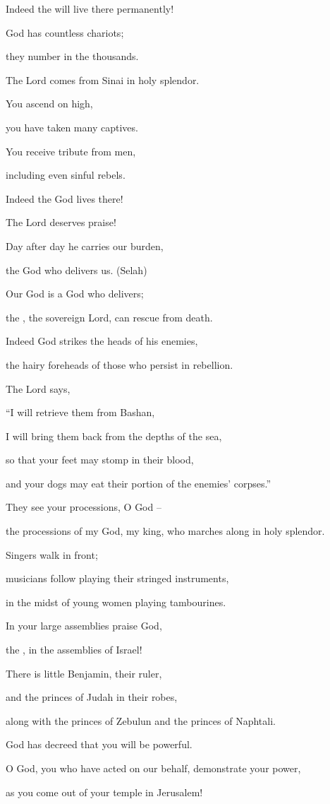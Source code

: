 {\par }{\Q Indeed
the {}
will live
there permanently!
\par }{\Q {}God
has countless
chariots;
\par }{\Q they number in the thousands.
\par }{\Q The Lord
comes from Sinai
in holy splendor.
\par }{\Q {}You ascend
on high,
\par }{\Q you have taken many
captives.
\par }{\Q You receive
tribute
from men,
\par }{\Q including even
sinful rebels.
\par }{\Q Indeed the
{}
God
lives there!
\par }{\Q {}The Lord
deserves
praise!

\par }{\Q Day
after day
he carries
our burden,
\par }{\Q the God
who delivers
us. (Selah)
\par }{\Q {}Our God
is a God
who delivers;
\par }{\Q the
{}, the sovereign Lord,
can rescue
from death.
\par }{\Q {}Indeed
God
strikes
the heads
of his enemies,
\par }{\Q the hairy
foreheads
of those who persist in rebellion.
\par }{\Q {}The Lord
says,
\par }{\Q “I will retrieve them from Bashan,
\par }{\Q I will bring
them back
from the depths
of the sea,
\par }{\Q {}so
that your feet
may stomp
in their blood,
\par }{\Q and your dogs
may eat their portion of the enemies’
corpses.”
\par }{\Q {}They see
your processions,
O God
–
\par }{\Q the processions
of my God,
my king,
who marches along in holy splendor.
\par }{\Q {}Singers
walk in front;
\par }{\Q musicians
follow
playing
their stringed instruments,

\par }{\Q in the midst
of young women playing
tambourines.
\par }{\Q {}In your large assemblies
praise
God,
\par }{\Q the {}, in the assemblies
of Israel!
\par }{\Q {}There
is little
Benjamin,
their ruler,
\par }{\Q and the princes
of Judah
in their robes,
\par }{\Q along with the princes
of Zebulun
and the princes
of Naphtali.
\par }{\Q {}God
has decreed
that you will be powerful.
\par }{\Q O God,
you who
have acted
on our behalf, demonstrate
your power,
\par }{\Q {}as you come out of your temple
in Jerusalem!

}
